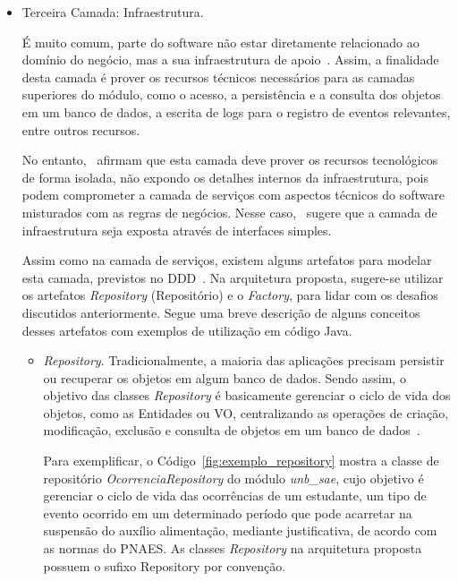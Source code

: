 \begin{itemize}
	\item Terceira Camada: Infraestrutura.

		É muito comum, parte do software 
		não estar diretamente relacionado 
		ao domínio do negócio, 
		mas a sua infraestrutura de apoio~\cite{avram2007domain}.
		Assim, a finalidade desta camada
		é prover os recursos técnicos
		necessários para as
		camadas superiores do módulo, 
		como o acesso, a persistência
		e a consulta dos objetos em um banco de dados, 
		a escrita de logs para o registro de eventos relevantes,	
		entre outros recursos.

		No entanto,~\cite{evans2004domain, fowler2002patterns} 
		afirmam que esta camada 
		deve prover os recursos 
		tecnológicos de forma isolada,
		não expondo
		os detalhes internos da 
		infraestrutura,
		pois podem comprometer a 
		camada de serviços
		com aspectos
		técnicos do software misturados com
		as regras de negócios. 
		Nesse caso,~\cite{avram2007domain} 
		sugere que a camada de infraestrutura
		seja exposta através de interfaces simples.
	

		Assim como na camada de serviços,
		existem alguns artefatos
		para modelar esta camada, 
		previstos no \acrshort{DDD}~\cite{evans2004domain}.
		Na arquitetura proposta, 
		sugere-se utilizar
		os artefatos \textit{Repository} (Repositório)
	 	e o \textit{Factory}, para lidar
	 	com os desafios discutidos anteriormente.
		Segue uma breve descrição
		de alguns conceitos desses artefatos 
		com exemplos de utilização em código Java.
			
		\begin{itemize}
		
			\item \textit{Repository}.	Tradicionalmente, a maioria das aplicações
			precisam persistir ou recuperar os objetos 
			em algum banco de dados.
			Sendo assim, o objetivo das 	
			classes \textit{Repository} é
			basicamente gerenciar o ciclo de vida dos objetos, 
			como as Entidades ou \acrshort{VO},
			centralizando as 
			operações de criação, modificação, exclusão
			e consulta de objetos em um banco de dados~\cite{vernon2013implementing}.
			
			Para exemplificar,
			o Código~\ref{fig:exemplo_repository} mostra
			a classe de repositório \emph{OcorrenciaRepository} 
			do módulo \emph{unb\_sae}, 
			cujo objetivo é gerenciar o ciclo de vida das
			ocorrências de um estudante, 
			um tipo
			de evento ocorrido em um determinado período	 
			que pode acarretar na suspensão do
			auxílio alimentação,
			mediante justificativa, de acordo 
			com as normas do \acrfull{PNAES}. 
			As classes \textit{Repository}
			na arquitetura proposta possuem
			o sufixo Repository por convenção. 
			

\end{itemize}
\end{itemize}
